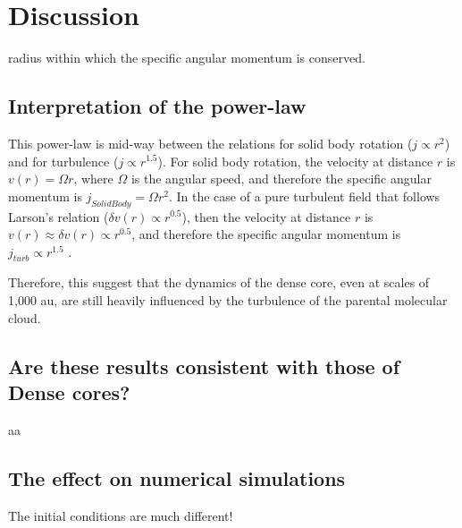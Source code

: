 \section{Discussion}


radius within which the specific angular momentum is conserved. 

\subsection{Interpretation of the power-law}
This power-law is mid-way between the relations for solid body rotation ($j\propto r^{2}$) and for turbulence ($j\propto r^{1.5}$). 
For solid body rotation, the velocity at distance $r$ is $v(r)=\Omega r$, 
where $\Omega$ is the angular speed, 
and therefore the specific angular momentum is $j_{SolidBody}=\Omega r^2$. 
In the case of a pure turbulent field that follows Larson's relation ($\delta v(r) \propto r^{0.5}$), 
then the velocity at distance $r$ is $v(r)\approx \delta v(r) \propto r^{0.5}$, 
and therefore the specific angular momentum is $j_{turb}\propto r^{1.5}$ \citep{Burkert_2000}. 

Therefore, this suggest that the dynamics of the dense core, even at scales of 1,000 au, are still 
heavily influenced by the turbulence of the parental molecular cloud.

\subsection{Are these results consistent with those of Dense cores?}
aa

\subsection{The effect on numerical simulations}
The initial conditions are much different!
 

  
  